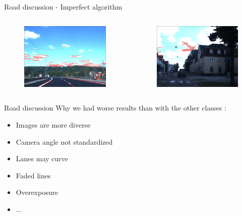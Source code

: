 \documentclass[12pt]{beamer}
\begin{document}
\begin{frame}{Road discussion - Imperfect algorithm}
\begin{columns}
\begin{figure}
            \includegraphics[width = \textwidth]{resources/png/roadbad3.png}
        \end{figure}
        \vspace{-1.3em}
        \begin{figure}
            \includegraphics[width = \textwidth]{resources/png/roadbad4.png}
        \end{figure}
    \end{columns}
\end{frame}

\begin{frame}{Road discussion}
Why we had worse results than with the other classes :
    \begin{itemize}
        \item Images are more diverse
        \item Camera angle not standardized
        \item Lanes may curve
        \item Faded lines
        \item Overexposure
        \item ...
    \end{itemize}
\end{frame}
\end{document}
